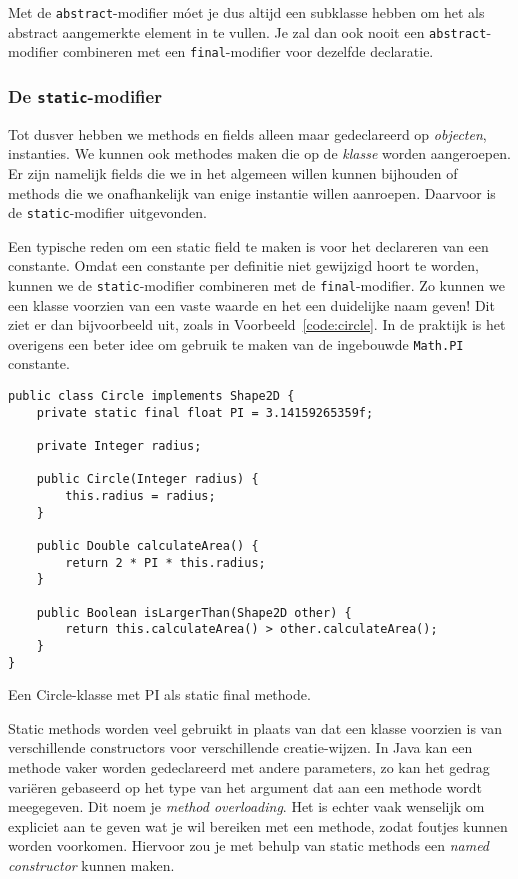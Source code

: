 \documentclass[dutch,a4paper,12pt,doubleside]{book}
\begin{document}
Met de \texttt{abstract}-modifier móet je dus altijd een subklasse hebben
om het als abstract aangemerkte element in te vullen.
Je zal dan ook nooit een \texttt{abstract}-modifier combineren met 
een \texttt{final}-modifier voor dezelfde declaratie.

\subsubsection{De \texttt{static}-modifier}
Tot dusver hebben we methods en fields alleen maar gedeclareerd op 
\emph{objecten}, instanties.
We kunnen ook methodes maken die op de \emph{klasse} worden aangeroepen.
Er zijn namelijk fields die we in het algemeen willen kunnen bijhouden
of methods die we onafhankelijk van enige instantie willen aanroepen.
Daarvoor is de \texttt{static}-modifier uitgevonden.

Een typische reden om een static field te maken is voor
het declareren van een constante. Omdat een constante per definitie
niet gewijzigd hoort te worden, kunnen we de \texttt{static}-modifier combineren 
met de \texttt{final}-modifier. Zo kunnen we een klasse voorzien van een vaste waarde 
en het een duidelijke naam geven! 
Dit ziet er dan bijvoorbeeld uit, zoals in Voorbeeld~\ref{code:circle}.
In de praktijk is het overigens een beter idee om gebruik te maken van
de ingebouwde \texttt{Math.PI} constante.

\begin{listing}[H]
\begin{verbatim}
public class Circle implements Shape2D {
    private static final float PI = 3.14159265359f;

    private Integer radius;

    public Circle(Integer radius) {
        this.radius = radius;
    }

    public Double calculateArea() {
        return 2 * PI * this.radius;
    }

    public Boolean isLargerThan(Shape2D other) {
        return this.calculateArea() > other.calculateArea();
    }
}
\end{verbatim}
\caption{Een Circle-klasse met PI als static final methode.}
\label{code:circle}
\end{listing}

Static methods worden veel gebruikt in plaats van dat een klasse voorzien is van 
verschillende constructors voor verschillende creatie-wijzen.
In Java kan een methode vaker worden gedeclareerd met andere parameters, zo kan 
het gedrag variëren gebaseerd op het type van het argument dat aan een methode wordt meegegeven.
Dit noem je \textit{method overloading}. Het is echter vaak wenselijk om expliciet 
aan te geven wat je wil bereiken met een methode, zodat foutjes kunnen worden voorkomen.
Hiervoor zou je met behulp van static methods een \textit{named constructor} kunnen maken.
\end{document}
